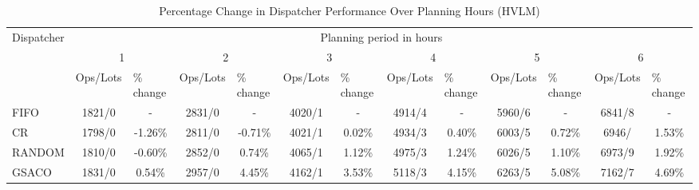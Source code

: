\begin{table}[]
	\caption{Percentage Change in Dispatcher Performance Over Planning Hours (HVLM)}\label{tab:dispatchers-HVLM} 
	\begin{tabular}{|l|cccccccccccc|}
		\hline
		\multirow{3}{*}{Dispatcher} &
		\multicolumn{12}{c|}{Planning period in hours} \\ \cline{2-13} 
		&
		\multicolumn{2}{c|}{1} &
		\multicolumn{2}{c|}{2} &
		\multicolumn{2}{c|}{3} &
		\multicolumn{2}{c|}{4} &
		\multicolumn{2}{c|}{5} &
		\multicolumn{2}{c|}{6} \\ \cline{2-13} 
		&
		\multicolumn{1}{l|}{Ops/Lots} &
		\multicolumn{1}{l|}{\% change} &
		\multicolumn{1}{l|}{Ops/Lots} &
		\multicolumn{1}{l|}{\% change} &
		\multicolumn{1}{l|}{Ops/Lots} &
		\multicolumn{1}{l|}{\% change} &
		\multicolumn{1}{l|}{Ops/Lots} &
		\multicolumn{1}{l|}{\% change} &
		\multicolumn{1}{l|}{Ops/Lots} &
		\multicolumn{1}{l|}{\% change} &
		\multicolumn{1}{l|}{Ops/Lots} &
		\multicolumn{1}{l|}{\% change} \\ \hline 
		FIFO &
		\multicolumn{1}{c|}{1821/0} &
		\multicolumn{1}{c|}{-} &
		\multicolumn{1}{c|}{2831/0} &
		\multicolumn{1}{c|}{-} &
		\multicolumn{1}{c|}{4020/1} &
		\multicolumn{1}{c|}{-} &
		\multicolumn{1}{c|}{4914/4} &
		\multicolumn{1}{c|}{-} &
		\multicolumn{1}{c|}{5960/6} &
		\multicolumn{1}{c|}{-} &
		\multicolumn{1}{c|}{6841/8} &
		- \\
		CR &
		\multicolumn{1}{c|}{1798/0} &
		\multicolumn{1}{c|}{-1.26\%} &
		\multicolumn{1}{c|}{2811/0} &
		\multicolumn{1}{c|}{-0.71\%} &
		\multicolumn{1}{c|}{4021/1} &
		\multicolumn{1}{c|}{0.02\%} &
		\multicolumn{1}{c|}{4934/3} &
		\multicolumn{1}{c|}{0.40\%} &
		\multicolumn{1}{c|}{6003/5} &
		\multicolumn{1}{c|}{0.72\%} &
		\multicolumn{1}{c|}{6946/}8 &
		1.53\% \\
		RANDOM &
		\multicolumn{1}{c|}{1810/0} &
		\multicolumn{1}{c|}{-0.60\%} &
		\multicolumn{1}{c|}{2852/0} &
		\multicolumn{1}{c|}{0.74\%} &
		\multicolumn{1}{c|}{4065/1} &
		\multicolumn{1}{c|}{1.12\%} &
		\multicolumn{1}{c|}{4975/3} &
		\multicolumn{1}{c|}{1.24\%} &
		\multicolumn{1}{c|}{6026/5} &
		\multicolumn{1}{c|}{1.10\%} &
		\multicolumn{1}{c|}{6973/9} &
		1.92\% \\
		GSACO &
		\multicolumn{1}{c|}{1831/0} &
		\multicolumn{1}{c|}{0.54\%} &
		\multicolumn{1}{c|}{2957/0} &
		\multicolumn{1}{c|}{4.45\%} &
		\multicolumn{1}{c|}{4162/1} &
		\multicolumn{1}{c|}{3.53\%} &
		\multicolumn{1}{c|}{5118/3} &
		\multicolumn{1}{c|}{4.15\%} &
		\multicolumn{1}{c|}{6263/5} &
		\multicolumn{1}{c|}{5.08\%} &
		\multicolumn{1}{c|}{7162/7} &
		4.69\% \\ \hline
	\end{tabular}%
\end{table}


